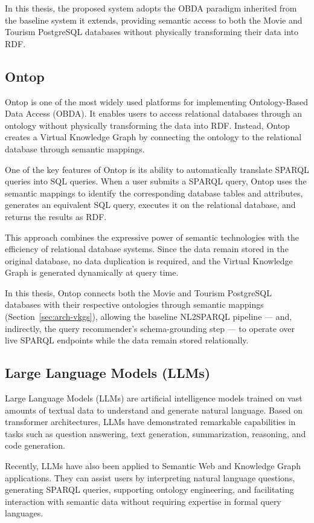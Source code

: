 In this thesis, the proposed system adopts the OBDA paradigm inherited from the baseline system it extends, providing semantic access to both the Movie and Tourism PostgreSQL databases without physically transforming their data into RDF.

\subsection{Ontop}
Ontop is one of the most widely used platforms for implementing Ontology-Based Data Access (OBDA). It enables users to access relational databases through an ontology without physically transforming the data into RDF. Instead, Ontop creates a Virtual Knowledge Graph by connecting the ontology to the relational database through semantic mappings.

One of the key features of Ontop is its ability to automatically translate SPARQL queries into SQL queries. When a user submits a SPARQL query, Ontop uses the semantic mappings to identify the corresponding database tables and attributes, generates an equivalent SQL query, executes it on the relational database, and returns the results as RDF.

This approach combines the expressive power of semantic technologies with the efficiency of relational database systems. Since the data remain stored in the original database, no data duplication is required, and the Virtual Knowledge Graph is generated dynamically at query time.

In this thesis, Ontop connects both the Movie and Tourism PostgreSQL databases with their respective ontologies through semantic mappings (Section~\ref{sec:arch-vkgs}), allowing the baseline NL2SPARQL pipeline --- and, indirectly, the query recommender's schema-grounding step --- to operate over live SPARQL endpoints while the data remain stored relationally.

\subsection{Large Language Models (LLMs)}
Large Language Models (LLMs) are artificial intelligence models trained on vast amounts of textual data to understand and generate natural language. Based on transformer architectures, LLMs have demonstrated remarkable capabilities in tasks such as question answering, text generation, summarization, reasoning, and code generation.

Recently, LLMs have also been applied to Semantic Web and Knowledge Graph applications. They can assist users by interpreting natural language questions, generating SPARQL queries, supporting ontology engineering, and facilitating interaction with semantic data without requiring expertise in formal query languages.

